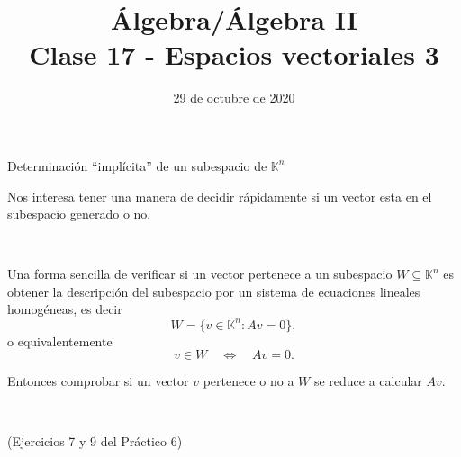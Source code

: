 \documentclass[handout]{beamer} %
\title[Clase 17 - Espacios vectoriales 3]{Álgebra/Álgebra II \\ Clase 17 - Espacios vectoriales 3}
\author[]{}
\institute[]{\normalsize FAMAF / UNC
	\\[\baselineskip] ${}^{}$
	\\[\baselineskip]
}
\date[29/10/2020]{29 de octubre de 2020}
\newcommand{\K}{\mathbb K}
\begin{document}
\begin{frame}
\maketitle
\end{frame}

    


    \begin{frame}{Determinación ``implícita'' de un subespacio de $\K^n$}
 
        Nos interesa tener una manera de decidir rápidamente si un vector esta en el subespacio generado o no.
        \pause

        \
        
        Una forma sencilla de verificar si un vector pertenece a un subespacio $W \subseteq\K^n$ es obtener la descripción del  subespacio por un sistema de ecuaciones lineales homogéneas,  es decir 
        \begin{equation*}
           W = \{v \in \K^n: Av =0\},
        \end{equation*} 
        o equivalentemente
        \begin{equation*}
            v \in W \quad \Leftrightarrow \quad Av =0.
        \end{equation*} 
        
        Entonces comprobar si un vector $v$ pertenece o no a $W$  se reduce a calcular $Av$. 
        \pause

        \
        
        (Ejercicios 7 y 9 del Pr\'actico 6)
        \vskip 2cm
        \end{frame}
        
\end{document}
